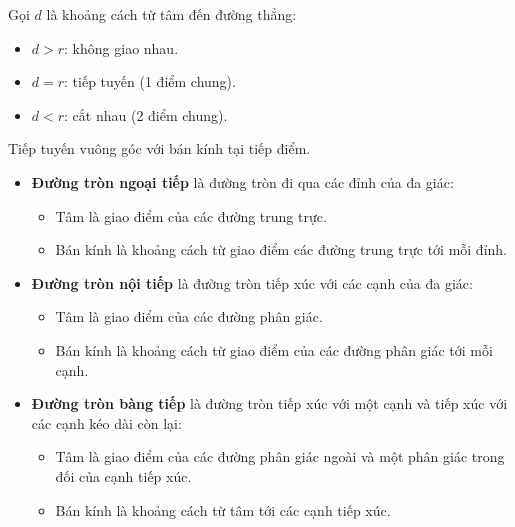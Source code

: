 \documentclass[12pt,a4paper]{article}
\begin{document}
\begin{tinhchat}[title={Vị trí tương đối của đường thẳng với đường tròn}]
  Gọi $d$ là khoảng cách từ tâm đến đường thẳng:
  \begin{itemize}
    \item $d > r$: không giao nhau.
    \item $d = r$: tiếp tuyến (1 điểm chung).
    \item $d < r$: cắt nhau (2 điểm chung).
  \end{itemize}
  Tiếp tuyến vuông góc với bán kính tại tiếp điểm.
\end{tinhchat}

\begin{tinhchat}[title={Đường tròn ngoại tiếp -- nội tiếp -- bàng tiếp}]
  \begin{itemize}
    \item \textbf{Đường tròn ngoại tiếp} là đường tròn đi qua các đỉnh của đa giác:
    \begin{itemize}
      \item Tâm là giao điểm của các đường trung trực.
      \item Bán kính là khoảng cách từ giao điểm các đường trung trực tới mỗi đỉnh.
    \end{itemize}

    \item \textbf{Đường tròn nội tiếp} là đường tròn tiếp xúc với các cạnh của đa giác:
    \begin{itemize}
      \item Tâm là giao điểm của các đường phân giác.
      \item Bán kính là khoảng cách từ giao điểm của các đường phân giác tới mỗi cạnh.
    \end{itemize}

    \item \textbf{Đường tròn bàng tiếp} là đường tròn tiếp xúc với một cạnh và tiếp xúc với các cạnh kéo dài còn lại:
    \begin{itemize}
      \item Tâm là giao điểm của các đường phân giác ngoài và một phân giác trong đối của cạnh tiếp xúc.
      \item Bán kính là khoảng cách từ tâm tới các cạnh tiếp xúc.
    \end{itemize}
  \end{itemize}
\end{tinhchat}
\end{document}
